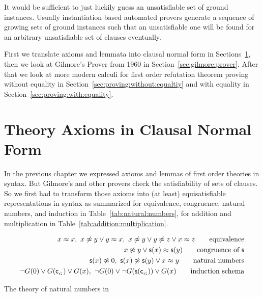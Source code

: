 
It would be sufficient to just luckily guess an unsatisfiable set of ground instances.
Usually instantiation based automated provers generate
a sequence of growing sets of ground instances
such that an unsatisfiable one will be found
for an arbitrary unsatisfiable set of clauses
eventually.

First we translate axioms and lemmata into clausal normal form in Sections~\ref{sec:clausal:normal:form},
then we look at Gilmore's Prover from 1960 in Section~\ref{sec:gilmore:prover}.
After that we look at more modern calculi for first order refutation theorem proving
without equality in Section~\ref{sec:proving:without:equaltiy} and with equality in Section~\ref{sec:proving:with:equality}.


%
%
%

%
%

\section{Theory Axioms in Clausal Normal Form}\label{sec:clausal:normal:form}

In the previous chapter we expressed axioms and lemmas of first order theories in \FOF{} syntax.
But Gilmore's and other provers check the satisfiability of sets of clauses. 
So we first had to transform
those axioms into (at least) equisatisfiable representations in \CNF{} syntax
as summarized for equivalence, congruence, natural numbers, and induction in Table~\ref{tab:natural:numbers},
for addition and multiplication in Table~\ref{tab:addition:multiplication}.

\begin{table}[hbt]
	\begin{align*}
	x\mEQ x,\
	x\mNE y\lor y\mEQ x,\
	x\mNE y\lor y\mNE z\lor x\mEQ z
	\tag*{equivalence}
	\\
	x\mNE y\lor \msucc(x)\mEQ\msucc(y)
	\tag*{congruence of \( \msucc \)}
	\\
	\msucc(x) \mNE 0,\
	\msucc(x) \mNE \msucc(y) \lor x \mEQ y
	\tag*{natural numbers}
	\\
	\lnot G(0) \lor {G(\mc_{_G})} \lor G(x),\
	\lnot G(0) \lor {\lnot G(\msucc(\mc_{_G}))} \lor G(x)
	\tag*{induction schema}
	\end{align*}
	\caption{The theory of natural numbers in \CNF}\label{tab:natural:numbers}
\end{table}

